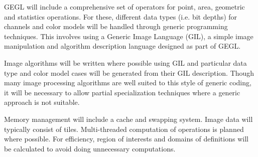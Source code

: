 GEGL will include a comprehensive set of operators for point, area, geometric
and statistics operations. For these, different data types (i.e. bit depths) for
channels and color models will be handled through generic programming
techniques. This involves using a Generic Image Language (GIL), a simple image
manipulation and algorithm description language designed as part of GEGL.  

Image algorithms will be written where possible using GIL and particular data
type and color model cases will be generated from their GIL description.
Though many image processing algorithms are well suited to this style of
generic coding, it will be necessary to allow partial specialization techniques
where a generic approach is not suitable. 

Memory management will include a cache and swapping system. Image data will
typically consist of tiles. Multi-threaded computation of operations is planned
where possible. For efficiency, region of interests and domains of definitions
will be calculated to avoid doing unnecessary computations.  
